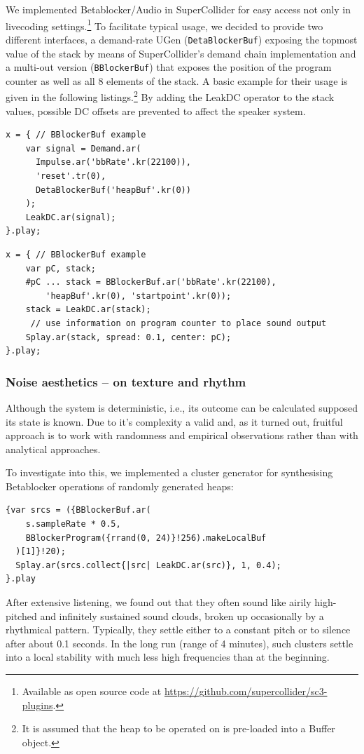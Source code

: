 \documentclass[letterpaper, 12pt]{article}
\begin{document}
We implemented Betablocker/Audio in SuperCollider for easy access not only in livecoding settings.\footnote{Available as open source code at \url{https://github.com/supercollider/sc3-plugins}.}
To facilitate typical usage, we decided to provide two different interfaces, a demand-rate UGen (\texttt{DetaBlockerBuf}) exposing the topmost value of the stack by means of SuperCollider's demand chain implementation and a multi-out version (\texttt{BBlockerBuf}) that exposes the position of the program counter as well as all 8 elements of the stack.
A basic example for their usage is given in the following listings.\footnote{It is assumed that the heap to be operated on is pre-loaded into a Buffer object.}
By adding the LeakDC operator to the stack values, possible DC offsets are prevented to affect the speaker system.

\begin{Verbatim}[fontfamily=courier, xleftmargin=\parindent]
x = { // BBlockerBuf example
	var signal = Demand.ar(
	  Impulse.ar('bbRate'.kr(22100)), 
	  'reset'.tr(0),
	  DetaBlockerBuf('heapBuf'.kr(0))
	);
	LeakDC.ar(signal);
}.play;
\end{Verbatim}

\begin{Verbatim}[fontfamily=courier, xleftmargin=\parindent]
x = { // BBlockerBuf example
	var pC, stack;
	#pC ... stack = BBlockerBuf.ar('bbRate'.kr(22100), 
		'heapBuf'.kr(0), 'startpoint'.kr(0));
	stack = LeakDC.ar(stack);
	 // use information on program counter to place sound output
	Splay.ar(stack, spread: 0.1, center: pC);
}.play;
\end{Verbatim}

\subsubsection{Noise aesthetics -- on texture and rhythm} 
\label{sub:noise_aesthetics}

Although the system is deterministic, i.e., its outcome can be calculated supposed its state is known.
Due to it's complexity a valid and, as it turned out, fruitful approach is to work with randomness and empirical observations rather than with analytical approaches.

To investigate into this, we implemented a cluster generator for synthesising Betablocker operations of randomly generated heaps:
\begin{Verbatim}[fontfamily=courier, xleftmargin=\parindent]
{var srcs = ({BBlockerBuf.ar(
    s.sampleRate * 0.5, 
    BBlockerProgram({rrand(0, 24)}!256).makeLocalBuf
  )[1]}!20);
  Splay.ar(srcs.collect{|src| LeakDC.ar(src)}, 1, 0.4);
}.play
\end{Verbatim}
After extensive listening, we found out that they often sound like airily high-pitched and infinitely sustained sound clouds, broken up occasionally by a rhythmical pattern. 
Typically, they settle either to a constant pitch or to silence after about 0.1 seconds.
In the long run (range of 4 minutes), such clusters settle into a local stability with much less high frequencies than at the beginning. 
\end{document}
